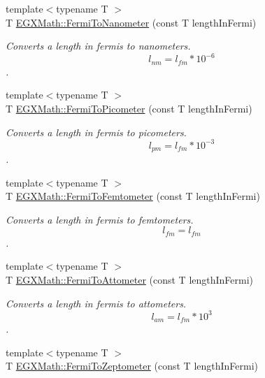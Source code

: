 \begin{DoxyCompactItemize}
{\footnotesize template$<$typename T $>$ }\\T \mbox{\hyperlink{group___e_g_x_math-_conversions-_length_conversions-_non-_s_i-_fermi-_s_i_gac6be3b8925451ea542a9e5d6d780dc4c}{E\+G\+X\+Math\+::\+Fermi\+To\+Nanometer}} (const T length\+In\+Fermi)
\begin{DoxyCompactList}\small\item\em Converts a length in fermis to nanometers. \[ l_{nm}=l_{fm} * 10^{-6} \]. \end{DoxyCompactList}\item 
{\footnotesize template$<$typename T $>$ }\\T \mbox{\hyperlink{group___e_g_x_math-_conversions-_length_conversions-_non-_s_i-_fermi-_s_i_ga9d12cf46e802908b3ee6f6e1c4d8047e}{E\+G\+X\+Math\+::\+Fermi\+To\+Picometer}} (const T length\+In\+Fermi)
\begin{DoxyCompactList}\small\item\em Converts a length in fermis to picometers. \[ l_{pm}=l_{fm} * 10^{-3} \]. \end{DoxyCompactList}\item 
{\footnotesize template$<$typename T $>$ }\\T \mbox{\hyperlink{group___e_g_x_math-_conversions-_length_conversions-_non-_s_i-_fermi-_s_i_ga79a9f408068ba1cbba8db425c8923340}{E\+G\+X\+Math\+::\+Fermi\+To\+Femtometer}} (const T length\+In\+Fermi)
\begin{DoxyCompactList}\small\item\em Converts a length in fermis to femtometers. \[ l_{fm}=l_{fm} \]. \end{DoxyCompactList}\item 
{\footnotesize template$<$typename T $>$ }\\T \mbox{\hyperlink{group___e_g_x_math-_conversions-_length_conversions-_non-_s_i-_fermi-_s_i_ga52a21bc3c66ca1103e6dd65ad528510a}{E\+G\+X\+Math\+::\+Fermi\+To\+Attometer}} (const T length\+In\+Fermi)
\begin{DoxyCompactList}\small\item\em Converts a length in fermis to attometers. \[ l_{am}=l_{fm} * 10^{3} \]. \end{DoxyCompactList}\item 
{\footnotesize template$<$typename T $>$ }\\T \mbox{\hyperlink{group___e_g_x_math-_conversions-_length_conversions-_non-_s_i-_fermi-_s_i_ga0f95ec9ae0444053a1d45ca652970f49}{E\+G\+X\+Math\+::\+Fermi\+To\+Zeptometer}} (const T length\+In\+Fermi)

\end{DoxyCompactItemize}
